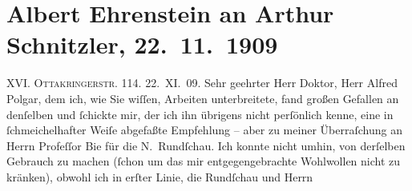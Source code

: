 

         
         \newcommand{\erwaehntePersonen}{Personen: Oskar Bie, Samuel Fischer, Alfred Polgar}
         \newcommand{\erwaehnteOrte}{Orte: Berlin, Ottakringerstraße, Wien}
         \newcommand{\erwaehnteWerke}{Werke: Die alte Geschichte, Die neue Rundschau, Mitgefühl, Saccumum, Tai-Gin, Tod des Zehir eddin Muhammed Baber, Tubutsch}
               \section[Albert Ehrenstein an Arthur Schnitzler, 22. 11. 1909]{ Albert Ehrenstein an Arthur Schnitzler, 22. 11. 1909}\nopagebreak{}\rehead{ }\begin{ledgroupsized}[t]{13cm}\normalsize\beginnumbering \toendnotes[C]{\smallbreak\pagebreak[2]} 
\toendnotes[C]{\smallbreak}\pstart
           \noindent{}{\pb}XVI. \textsc{Ottakringerstr.} 114.
                        \hfill 22. XI. 09.
                        \pend
           \pstart{}Sehr geehrter Herr Doktor,\pend\pstart
           Herr Alfred Polgar, dem ich, wie Sie wiſſen,
                    Arbeiten unterbreitete, fand großen Gefallen an denſelben und ſchickte mir, der
                    ich ihn übrigens nicht perſönlich kenne, eine in ſchmeichelhafter Weiſe
                    abgefaßte Empfehlung – aber zu meiner Überraſchung an Herrn Profeſſor Bie für die N. Rundſchau. Ich konnte nicht umhin, von derſelben Gebrauch zu machen
                    (ſchon um das mir entgegengebrachte Wohlwollen nicht zu kränken), obwohl ich in
                    erſter Linie, die Rundſchau und Herrn

\end{ledgroupsized}

